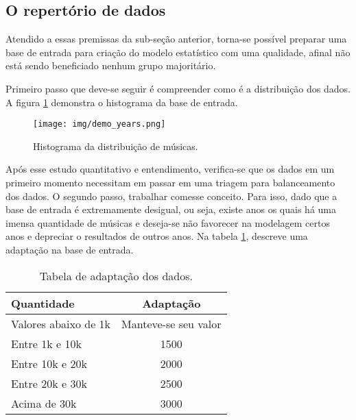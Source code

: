\documentclass[journal]{IEEEtran}
\begin{document}
\begin{description}

\end{description}

\subsection{O repertório de dados}

Atendido a essas premissas da sub-seção anterior, torna-se possível preparar uma base de entrada para criação do modelo estatístico com uma qualidade, afinal não está sendo beneficiado nenhum grupo majoritário.

Primeiro passo que deve-se seguir é compreender como é a distribuição dos dados. A figura \ref{fig:demo_years} demonstra o histograma da base de entrada.

\begin{figure}[h]
\centering
\texttt{[image: img/demo\_years.png]}
\caption{\small{Histograma da distribuição de músicas.}}
\label{fig:demo_years}
\end{figure}

Após esse estudo quantitativo e entendimento, verifica-se que os dados em um primeiro momento necessitam em passar em uma triagem para balanceamento dos dados. O segundo passo, trabalhar comesse conceito. Para isso, dado que a base de entrada é extremamente desigual, ou seja, existe anos os quais há uma imensa quantidade de músicas e deseja-se não favorecer na modelagem certos anos e depreciar o resultados de outros anos. Na tabela \ref{tab:adaptation}, descreve uma adaptação na base de entrada. 

\begin{table}[h]
\caption{Tabela de adaptação dos dados.}
\centering
    \begin{tabular}{ | l | c |}
    \hline
    \textbf{Quantidade} & \textbf{Adaptação} \\ \hline
    Valores abaixo de 1k & Manteve-se seu valor  \\ \hline
    Entre 1k e 10k & 1500  \\ \hline
    Entre 10k e 20k & 2000  \\ \hline
    Entre 20k e 30k & 2500  \\ \hline
    Acima de 30k & 3000 \\ \hline
    \end{tabular}
\label{tab:adaptation}
\end{table}
\end{document}
